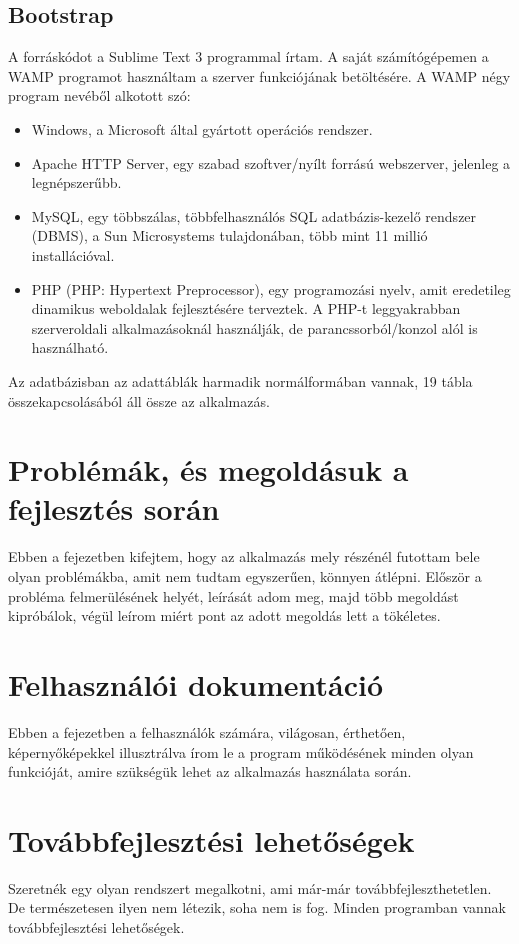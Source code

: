 \documentclass[
]{thesis-ekf}
\begin{document}
\section{Bootstrap}
A forráskódot a Sublime Text 3 programmal írtam. A saját számítógépemen a WAMP programot használtam a szerver funkciójának betöltésére.
A WAMP négy program nevéből alkotott szó:
\begin{itemize}
	\item Windows, a Microsoft által gyártott operációs rendszer.
	\item Apache HTTP Server, egy szabad szoftver/nyílt forrású webszerver, jelenleg a legnépszerűbb.
	\item MySQL, egy többszálas, többfelhasználós SQL adatbázis-kezelő rendszer (DBMS), a Sun Microsystems tulajdonában, több mint 11 millió installációval.
	\item PHP (PHP: Hypertext Preprocessor), egy programozási nyelv, amit eredetileg dinamikus weboldalak fejlesztésére terveztek. A PHP-t leggyakrabban szerveroldali alkalmazásoknál használják, de parancssorból/konzol alól is használható.
\end{itemize}


 Az adatbázisban az adattáblák harmadik normálformában vannak, 19 tábla összekapcsolásából áll össze az alkalmazás.
\chapter{Problémák, és megoldásuk a fejlesztés során}
Ebben a fejezetben kifejtem, hogy az alkalmazás mely részénél futottam bele olyan problémákba, amit nem tudtam egyszerűen, könnyen átlépni. Először a probléma felmerülésének helyét, leírását adom meg, majd több megoldást kipróbálok, végül leírom miért pont az adott megoldás lett a tökéletes.
\chapter{Felhasználói dokumentáció}
Ebben a fejezetben a felhasználók számára, világosan, érthetően, képernyőképekkel illusztrálva írom le a program működésének minden olyan funkcióját, amire szükségük lehet az alkalmazás használata során.
\chapter{Továbbfejlesztési lehetőségek}
Szeretnék egy olyan rendszert megalkotni, ami már-már továbbfejleszthetetlen. De természetesen ilyen nem létezik, soha nem is fog. Minden programban vannak továbbfejlesztési lehetőségek.
\end{document}
